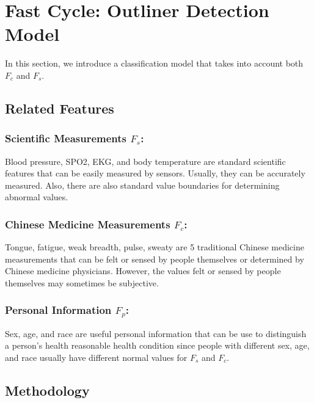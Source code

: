 \section{Fast Cycle: Outliner Detection Model}\label{sec:fastCycle}
In this section, we introduce a classification model that takes into account both $F_c$ and $F_s$. 

\subsection{Related Features}\label{relatedFeatures}


\subsubsection{Scientific Measurements $F_s$:}
Blood pressure, SPO2, EKG, and body temperature are standard scientific features that can be easily measured by sensors. 
Usually, they can be accurately measured. Also, there are also standard value boundaries for determining abnormal values. 

\subsubsection{Chinese Medicine Measurements $F_c$:}
Tongue, fatigue, weak breadth, pulse, sweaty are 5 traditional Chinese medicine measurements that can be felt or sensed by 
people themselves or determined by Chinese medicine physicians. However, the values felt or sensed by people themselves 
may sometimes be subjective. 

\subsubsection{Personal Information $F_p$:}
Sex, age, and race are useful personal information that can be use to distinguish a person's health reasonable health condition 
since people with different sex, age, and race usually have different normal values for $F_s$ and $F_c$. 

\subsection{Methodology}


